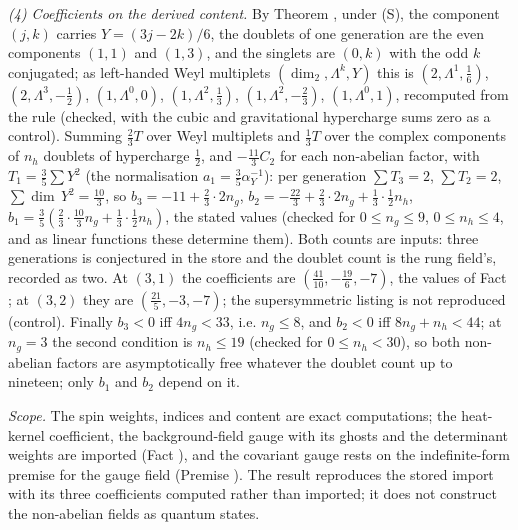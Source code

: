 \emph{(4) Coefficients on the derived content.} By Theorem , under (S), the component $(j, k)$ carries $Y = (3j - 2k)/6$, the doublets of one generation are the even components $(1,1)$ and $(1,3)$, and the singlets are $(0, k)$ with the odd $k$ conjugated; as left-handed Weyl multiplets $(\dim_{2}, \Lambda^{k}, Y)$ this is $(2, \Lambda^{1}, \tfrac16)$, $(2, \Lambda^{3}, -\tfrac12)$, $(1, \Lambda^{0}, 0)$, $(1, \Lambda^{2}, \tfrac13)$, $(1, \Lambda^{2}, -\tfrac23)$, $(1, \Lambda^{0}, 1)$, recomputed from the rule (checked, with the cubic and gravitational hypercharge sums zero as a control). Summing $\tfrac23T$ over Weyl multiplets and $\tfrac13T$ over the complex components of $n_{h}$ doublets of hypercharge $\tfrac12$, and $-\tfrac{11}{3}C_{2}$ for each non-abelian factor, with $T_{1} = \tfrac35\sum Y^{2}$ (the normalisation $a_{1} = \tfrac35\alpha_{Y}^{-1}$): per generation $\sum T_{3} = 2$, $\sum T_{2} = 2$, $\sum\dim\,Y^{2} = \tfrac{10}{3}$, so $b_{3} = -11 + \tfrac23\cdot2n_{g}$, $b_{2} = -\tfrac{22}{3} + \tfrac23\cdot2n_{g} + \tfrac13\cdot\tfrac12n_{h}$, $b_{1} = \tfrac35(\tfrac23\cdot\tfrac{10}{3}n_{g} + \tfrac13\cdot\tfrac12n_{h})$, the stated values (checked for $0 \leq n_{g} \leq 9$, $0 \leq n_{h} \leq 4$, and as linear functions these determine them). Both counts are inputs: three generations is conjectured in the store and the doublet count is the rung field's, recorded as two. At $(3, 1)$ the coefficients are $(\tfrac{41}{10}, -\tfrac{19}{6}, -7)$, the values of Fact ; at $(3, 2)$ they are $(\tfrac{21}{5}, -3, -7)$; the supersymmetric listing is not reproduced (control). Finally $b_{3} < 0$ iff $4n_{g} < 33$, i.e. $n_{g} \leq 8$, and $b_{2} < 0$ iff $8n_{g} + n_{h} < 44$; at $n_{g} = 3$ the second condition is $n_{h} \leq 19$ (checked for $0 \leq n_{h} < 30$), so both non-abelian factors are asymptotically free whatever the doublet count up to nineteen; only $b_{1}$ and $b_{2}$ depend on it.

\emph{Scope.} The spin weights, indices and content are exact computations; the heat-kernel coefficient, the background-field gauge with its ghosts and the determinant weights are imported (Fact ), and the covariant gauge rests on the indefinite-form premise for the gauge field (Premise ). The result reproduces the stored import  with its three coefficients computed rather than imported; it does not construct the non-abelian fields as quantum states.

